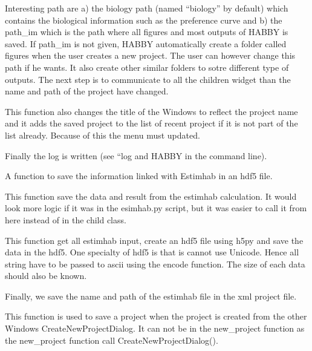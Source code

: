\documentclass[letterpaper,10pt,english]{sphinxmanual}
\begin{document}
\begin{fulllineitems}
\begin{fulllineitems}
Interesting path are a) the biology path (named ``biology'' by default) which contains the biological information
such as the preference curve and b) the path\_im which is the path where all figures and most outputs of HABBY
is saved. If path\_im is not given, HABBY automatically create a folder called figures when the
user creates a new project. The user can however change this path if he wants. It also create other similar
folders to sotre different type of outputs. The next step is to communicate
to all the children widget than the name and path of the project have changed.

This function also changes the title of the Windows to reflect the project name and it adds the saved
project to the list of recent project if it is not part of the list already. Because of this the menu must
updated.

Finally the log is written (see “log and HABBY in the command line).

\end{fulllineitems}


\begin{fulllineitems}
\label{\detokenize{index:src_GUI.Main_windows_1.MainWindows.save_project_estimhab}}
A function to save the information linked with Estimhab in an hdf5 file.


This function save the data and result from the estimhab calculation. It would look more logic if it was in
the esimhab.py script, but it was easier to call it from here instead of in the child class.

This function get all estimhab input, create an hdf5 file using h5py and save the data in the hdf5. One
specialty of hdf5 is that is cannot use Unicode. Hence all string have to be passed to ascii using the encode
function. The size of each data should also be known.

Finally, we save the name and path of the estimhab file in the xml project file.

\end{fulllineitems}


\begin{fulllineitems}
\label{\detokenize{index:src_GUI.Main_windows_1.MainWindows.save_project_if_new_project}}
This function is used to save a project when the project is created from the other Windows CreateNewProjectDialog. It
can not be in the new\_project function as the new\_project function call CreateNewProjectDialog().


\end{fulllineitems}
\end{fulllineitems}
\end{document}
